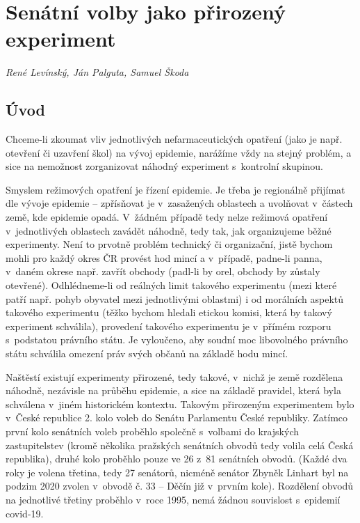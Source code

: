 
\chapter{Senátní volby jako přirozený experiment}\label{Prirozene_experimenty}

\textit{René Levínský, Ján Palguta, Samuel Škoda}

\section*{Úvod}
Chceme-li zkoumat vliv jednotlivých nefarmaceutických opatření (jako je např. otevření či uzavření škol) na vývoj epidemie, narážíme vždy na stejný problém, a sice na nemožnost zorganizovat náhodný experiment s~kontrolní skupinou. 

Smyslem režimových opatření je řízení epidemie. Je třeba je regionálně přijímat dle vývoje epidemie -- zpřísňovat je v~zasažených oblastech a uvolňovat v~částech země, kde epidemie opadá. V~žádném případě tedy nelze režimová opatření v~jednotlivých oblastech zavádět náhodně, tedy tak, jak organizujeme běžné experimenty. Není to prvotně problém technický či organizační, jistě bychom mohli pro každý okres ČR provést hod mincí a v~případě, padne-li panna, v~daném okrese např. zavřít obchody (padl-li by orel, obchody by zůstaly otevřené). Odhlédneme-li od reálných limit takového experimentu (mezi které patří např. pohyb obyvatel mezi jednotlivými oblastmi) i od morálních aspektů takového experimentu (těžko bychom hledali etickou komisi, která by takový experiment schválila), provedení takového experimentu je v~přímém rozporu s~podstatou právního státu. Je vyloučeno, aby soudní moc libovolného právního státu schválila omezení práv svých občanů na základě hodu mincí.

Naštěstí existují experimenty přirozené, tedy takové, v~nichž je země rozdělena náhodně, nezávisle na průběhu epidemie, a sice na základě pravidel, která byla schválena v~jiném historickém kontextu. Takovým přirozeným experimentem bylo v~České republice 2. kolo voleb do Senátu Parlamentu České republiky. Zatímco první kolo senátních voleb proběhlo společně s~volbami do krajských zastupitelstev (kromě několika pražských senátních obvodů tedy volila celá Česká republika), druhé kolo proběhlo pouze ve 26 z~81 senátních obvodů. (Každé dva roky je volena třetina, tedy 27 senátorů, nicméně senátor Zbyněk Linhart byl na podzim 2020 zvolen v~obvodě č. 33 -- Děčín již v~prvním kole). Rozdělení obvodů na jednotlivé třetiny 
proběhlo v~roce 1995, nemá žádnou souvislost s~epidemií covid-19. 

